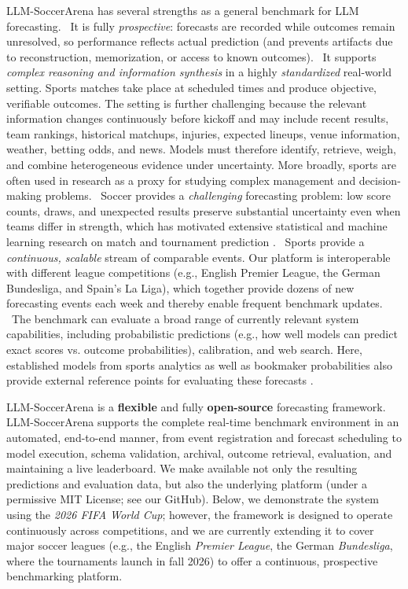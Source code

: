 \documentclass[sigconf,nonacm]{acmart}
\newcommand{\arena}{\mbox{LLM-SoccerArena}\xspace}
\newcommand{\circnum}[2][tikzblue]{%
\tikz[baseline=-0.55ex]{
\node[
    circle,
    draw=#1,
    text=#1,
    line width=0.35pt,
    minimum size=1.0em,
    inner sep=0pt,
    font=\bfseries\fontsize{6.5}{6.5}\selectfont
] {#2};
}%
}
\begin{document}
\arena has several strengths as a general benchmark for LLM forecasting. \circnum[tikzred]{1}~It is fully \emph{prospective}: forecasts are recorded while outcomes remain unresolved, so performance reflects actual prediction (and prevents artifacts due to reconstruction, memorization, or access to known outcomes). \circnum[tikzred]{2}~It supports \emph{complex reasoning and information synthesis} in a highly \emph{standardized} real-world setting. Sports matches take place at scheduled times and produce objective, verifiable outcomes. The setting is further challenging because the relevant information changes continuously before kickoff and may include recent results, team rankings, historical matchups, injuries, expected lineups, venue information, weather, betting odds, and news. Models must therefore identify, retrieve, weigh, and combine heterogeneous evidence under uncertainty. More broadly, sports are often used in research as a proxy for studying complex management and decision-making problems. \circnum[tikzred]{3}~Soccer provides a \emph{challenging} forecasting problem: low score counts, draws, and unexpected results preserve substantial uncertainty even when teams differ in strength, which has motivated extensive statistical and machine learning research on match and tournament prediction \citep{maher_1982,dixon_coles_1997,groll_etal_2015,sportsprediction}. \circnum[tikzred]{4}~Sports provide a \emph{continuous, scalable} stream of comparable events. Our platform is interoperable with different league competitions (e.g., English Premier League, the German Bundesliga, and Spain’s La Liga), which together provide dozens of new forecasting events each week and thereby enable frequent benchmark updates. \circnum[tikzred]{5}~The benchmark can evaluate a broad range of currently relevant system capabilities, including probabilistic predictions (e.g., how well models can predict exact scores vs. outcome probabilities), calibration, and web search. Here, established models from sports analytics as well as bookmaker probabilities also provide external reference points for evaluating these forecasts \citep{leitner_etal_2010,ley_etal_2019,zeileis_etal_2018}. 

\arena is a \textbf{flexible} and fully \textbf{open-source} forecasting framework. \arena supports the complete real-time benchmark environment in an automated, end-to-end manner, from event registration and forecast scheduling to model execution, schema validation, archival, outcome retrieval, evaluation, and maintaining a live leaderboard. We make available not only the resulting predictions and evaluation data, but also the underlying platform (under a permissive MIT License; see our GitHub). Below, we demonstrate the system using the \emph{2026 FIFA World Cup}; however, the framework is designed to operate continuously across competitions, and we are currently extending it to cover major soccer leagues (e.g., the English \emph{Premier League}, the German \emph{Bundesliga}, where the tournaments launch in fall 2026) to offer a continuous, prospective benchmarking platform.
\end{document}
